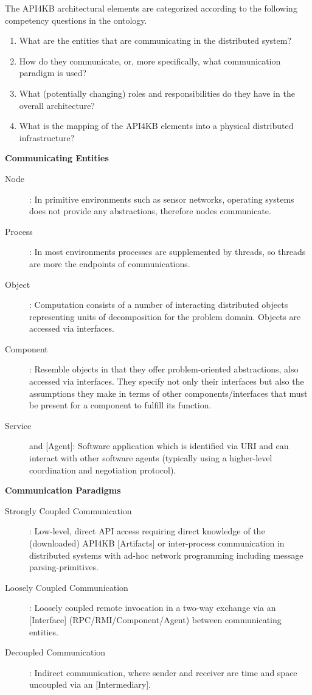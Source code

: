 \documentclass[runningheads]{llncs}
\begin{document}
The API4KB architectural elements are categorized according to the following competency questions in the ontology.

\begin{enumerate}
\item What are the entities that are communicating in the distributed system?
\item How do they communicate, or, more specifically, what communication paradigm is used?
\item What (potentially changing) roles and responsibilities do they have in the overall architecture?
\item What is the mapping of the API4KB elements into a physical distributed infrastructure?
\end{enumerate}

\textbf{Communicating Entities}

\begin{description}
    \item [Node]: In primitive environments such as sensor networks, operating systems does not provide any abstractions, therefore nodes communicate.
    \item [Process]: In most environments processes are supplemented by threads, so threads are more the endpoints of communications.
    \item [Object]: Computation consists of a number of interacting distributed objects representing units of decomposition for the problem domain. Objects are accessed via interfaces.
    \item [Component]: Resemble objects in that they offer problem-oriented abstractions, also accessed via interfaces. They specify not only their interfaces but also the assumptions they make in terms of other components/interfaces that must be present for a component to fulfill its function.
    \item [Service] and [Agent]: Software application which is identified via URI and can interact with other software agents (typically using a higher-level coordination and negotiation protocol).
\end{description}

\textbf{Communication Paradigms}

\begin{description}
    \item [Strongly Coupled Communication]: Low-level, direct API access requiring direct knowledge of the (downloaded) API4KB [Artifacts] or inter-process communication in distributed systems with ad-hoc network programming including message parsing-primitives.
    \item [Loosely Coupled Communication]: Loosely coupled remote invocation in a two-way exchange via an [Interface] (RPC/RMI/Component/Agent) between communicating entities.
    \item [Decoupled Communication]: Indirect communication, where sender and receiver are time and space uncoupled via an [Intermediary].
\end{description}
\end{document}
